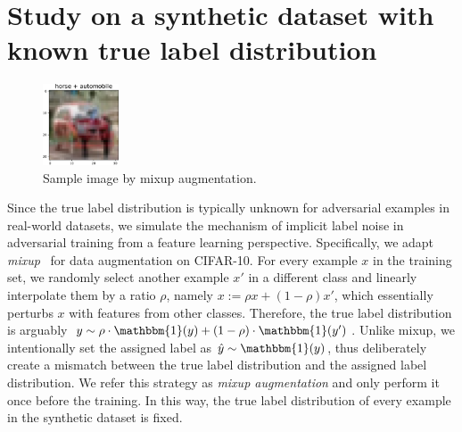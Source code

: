 \section{Study on a synthetic dataset with known true label distribution}




    
    \begin{figure} %
      \vspace{-3mm}
      \centering
      \includegraphics[width=0.2\textwidth]{figures/method-augment-image-example.pdf}
      \caption{Sample image by mixup augmentation.}
    \label{fig:method-augment-example}
    \end{figure}
    
    Since the true label distribution is typically unknown for adversarial examples in real-world datasets, 
    we simulate the mechanism of implicit label noise in adversarial training from a feature learning perspective.
    Specifically, we adapt \emph{mixup}~\citep{Zhang2018mixupBE} for data augmentation on CIFAR-10. 
    For every example $x$ in the training set, we randomly select another example $x'$ in a different class and linearly interpolate them by a ratio $\rho$, namely $x:= \rho x + (1-\rho) x'$, which essentially perturbs $x$ with features from other classes. 
    Therefore, the true label distribution is arguably $y \sim \rho\cdot \mathbbm{1}(y) + (1-\rho)\cdot  \mathbbm{1}(y')$.
    Unlike mixup, we intentionally set the assigned label as $\hat{y} \sim \mathbbm{1}(y)$, thus deliberately create a mismatch between the true label distribution and the assigned label distribution.
    We refer this strategy as \emph{mixup augmentation} and only perform it once before the training. 
    In this way, the true label distribution of every example in the synthetic dataset is fixed.
    
